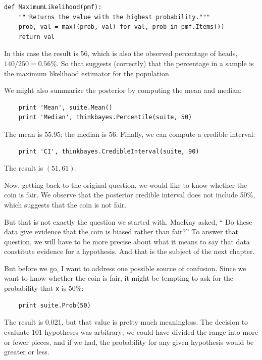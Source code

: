 \documentclass[12pt]{book}
\begin{document}
\begin{verbatim}
def MaximumLikelihood(pmf):
    """Returns the value with the highest probability."""
    prob, val = max((prob, val) for val, prob in pmf.Items())
    return val
\end{verbatim}

In this case the result is 56, which is also the observed percentage of
heads, $140/250 = 0.56\%$.  So that suggests (correctly) that the
percentage in a sample is the maximum likelihood estimator
for the population.

We might also summarize the posterior by computing the mean
and median:

\begin{verbatim}
    print 'Mean', suite.Mean()
    print 'Median', thinkbayes.Percentile(suite, 50)
\end{verbatim}

The mean is 55.95; the median is 56.  Finally, we can compute a
credible interval: 

\begin{verbatim}
    print 'CI', thinkbayes.CredibleInterval(suite, 90)
\end{verbatim}

The result is $(51, 61)$.

Now, getting back to the original question,
we would like to know whether the coin is fair.  We observe
that the posterior credible interval does not include 50\%,
which suggests that the coin is not fair.

But that is not exactly the question we started with.  MacKay asked,
`` Do these data give evidence that the coin is biased rather than
fair?''  To answer that question, we will have to be more precise
about what it means to say that data constitute evidence for
a hypothesis.  And that is the subject of the next chapter.

But before we go, I want to address one possible source of confusion.
Since we want to know whether the coin is fair, it might be tempting
to ask for the probability that {\tt x} is 50\%:

\begin{verbatim}
    print suite.Prob(50)
\end{verbatim}

The result is 0.021, but that value is pretty much meaningless.  The
decision to evaluate 101 hypotheses was arbitrary; we could have
divided the range into more or fewer pieces, and if we had, the
probability for any given hypothesis would be greater or less.
\end{document}

